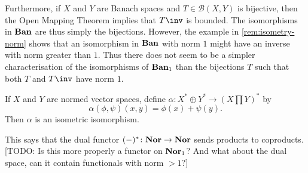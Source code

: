\documentclass[article, a4paper, 11pt, oneside]{memoir}
\numberwithin{equation}{chapter}
\newcommand{\calB}{\mathcal{B}}
\theoremstyle{nonumberplain}
\begin{document}
\begin{remarkbreak}
	Furthermore, if $X$ and $Y$ are Banach spaces and $T \in \calB(X,Y)$ is bijective, then the Open Mapping Theorem implies that $T\inv$ is bounded. The isomorphisms in $\mathbf{Ban}$ are thus simply the bijections. However, the example in \cref{rem:isometry-norm} shows that an isomorphism in $\mathbf{Ban}$ with norm $1$ might have an inverse with norm greater than $1$. Thus there does not seem to be a simpler characterisation of the isomorphisms of $\mathbf{Ban}_1$ than the bijections $T$ such that both $T$ and $T\inv$ have norm $1$.
\end{remarkbreak}


\begin{exerciseframed*}[21]
	If $X$ and $Y$ are normed vector spaces, define $\alpha \colon X^* \oplus Y^* \to (X \prod Y)^*$ by
	\begin{equation*}
		\alpha(\phi,\psi)(x,y) = \phi(x) + \psi(y).
	\end{equation*}
	Then $\alpha$ is an isometric isomorphism.
\end{exerciseframed*}
%
This says that the dual functor $(-)^* \colon \mathbf{Nor} \to \mathbf{Nor}$ sends products to coproducts. [TODO: Is this more properly a functor on $\mathbf{Nor}_1$? And what about the dual space, can it contain functionals with norm $>1$?]
\end{document}
